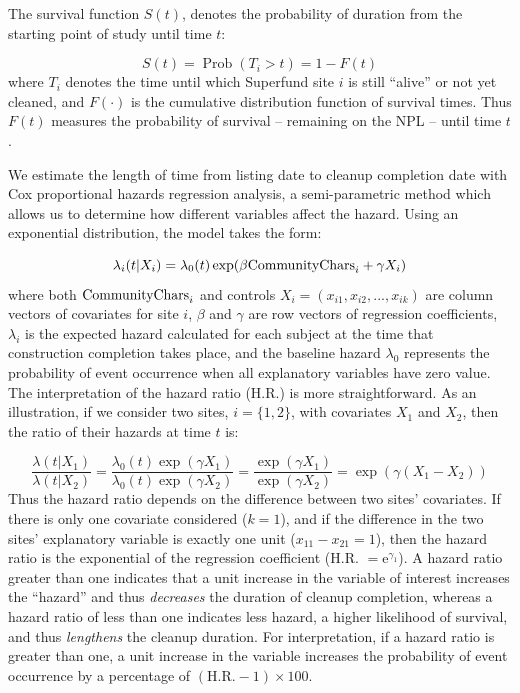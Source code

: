 \documentclass[12pt]{article}
\newcommand{\e}{\mathrm{e}}
\begin{document}
The survival function $S(t)$, denotes the probability of duration from the starting point of study until time $t$: 

\begin{equation}
S(t)=\operatorname{Prob}(T_i>t)=1-F(t)  \label{surv}
\end{equation}
where $T_i$ denotes the time until which Superfund site $i$ is still ``alive'' or not yet cleaned, and $F(\cdot)$ is the cumulative distribution function of survival times. Thus $F(t)$ measures the probability of survival -- remaining on the NPL -- until time $t$.

We estimate the length of time from listing date to cleanup completion date with Cox proportional hazards regression analysis, a semi-parametric method which allows us to determine how different variables affect the hazard. 
Using an exponential distribution, the model takes the form:

\begin{equation}
\lambda_{i}(t|X_{i}) =\lambda_{0}(t)\exp(\beta \mathrm{CommunityChars}_i + \gamma X_{i}) \label{PH1}
\end{equation}
where both $\mathrm{CommunityChars}_i$ and controls $X_{i}=(x_{i1}, x_{i2},..., x_{ik})$ are column vectors of covariates for site $i$, $\beta$ and $\gamma$ are row vectors of regression coefficients, $\lambda_{i}$ is the expected hazard calculated for each subject at the time that construction completion takes place, and the baseline hazard $\lambda_{0}$ represents the probability of event occurrence when all explanatory variables have zero value. The interpretation of the hazard ratio (H.R.) is more straightforward. As an illustration, if we consider two sites, $i = \{1, 2\}$, with covariates $X_{1}$ and $X_{2}$, then the ratio of their hazards at time $t$ is:

\begin{equation}
\frac{\lambda(t|X_{1})}{\lambda(t|X_{2})}=\frac{\lambda_{0}(t) \exp(\gamma X_{1})}{\lambda_{0}(t) \exp(\gamma X_{2})}=\frac{\exp(\gamma X_{1})}{\exp(\gamma X_{2})}=\exp(\gamma(X_{1}-X_{2}))
\end{equation}
Thus the hazard ratio depends on the difference between two sites' covariates. If there is only one covariate considered ($k=1$), and if the difference in the two sites' explanatory variable is exactly one unit ($x_{11}- x_{21}=1$), then the hazard ratio is the exponential of the regression coefficient (H.R. $= \e^{\gamma_1}$). A hazard ratio greater than one indicates that a unit increase in the variable of interest increases the ``hazard'' and thus \emph{decreases} the duration of cleanup completion, whereas a hazard ratio of less than one indicates less hazard, a higher likelihood of survival, and thus \emph{lengthens} the cleanup duration. For interpretation, if a hazard ratio is greater than one, a unit increase in the variable increases the probability of event occurrence by a percentage of $(\mathrm{H.R.}-1)\times100$. 
\end{document}
